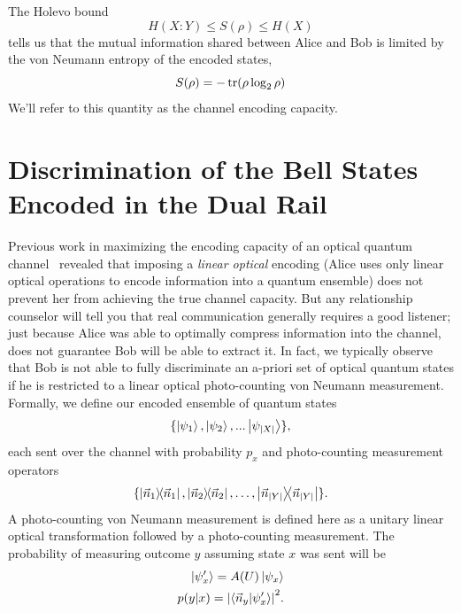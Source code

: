 \documentclass[aps,pra,twocolumn,showpacs,superscriptaddress,floatfix,10pt]{revtex4}
\begin{document}
The Holevo bound~\cite{Holevo,Jake Smith}
\begin{equation}
	H(X:Y) \le S(\rho) \le H(X)
\end{equation}
tells us that the mutual information shared between Alice and Bob is limited by the von Neumann entropy of the encoded states,
\begin{equation}
	S(\rho) = - \tr( \rho \log_2 \rho )
\end{equation}
We'll refer to this quantity as the channel encoding capacity.

\section{Discrimination of the Bell States Encoded in the Dual Rail}
Previous work in maximizing the encoding capacity of an optical quantum channel~\cite{First Paper} revealed that imposing a \textit{linear optical} encoding (Alice uses only linear optical operations to encode information into a quantum ensemble) does not prevent her from achieving the true channel capacity. But any relationship counselor will tell you that real communication generally requires a good listener; just because Alice was able to optimally compress information into the channel, does not guarantee Bob will be able to extract it. In fact, we typically observe that Bob is not able to fully discriminate an a-priori set of optical quantum states if he is restricted to a linear optical photo-counting von Neumann measurement. Formally, we define our encoded ensemble of quantum states
\begin{equation}
\{\ket{\psi_1},\ket{\psi_2},...\ket{\psi_{\abs{X}}}\},
\end{equation}  
each sent over the channel with probability $p_x$
and photo-counting measurement operators
\begin{equation}
\{ \outerproduct{\vec{n}_1}{\vec{n}_1}, \outerproduct{\vec{n}_2}{\vec{n}_2}, \dots , \outerproduct{\vec{n}_{\abs{Y}}}{\vec{n}_{\abs{Y}} } \}.
\end{equation}
A photo-counting von Neumann measurement is defined here as a unitary linear optical transformation followed by a photo-counting measurement. The probability of measuring outcome $y$ assuming state $x$ was sent will be
\begin{eqnarray}
\label{von Neumann conditional probability part 1}
\ket{\psi_x^\prime} = A(U) \ket{\psi_x} \\
\label{von Neumann conditional probability part 2}
p(y|x) = \abs{\braket{\vec{n}_y}{\psi_x^\prime}}^2.
\end{eqnarray}
\end{document}
